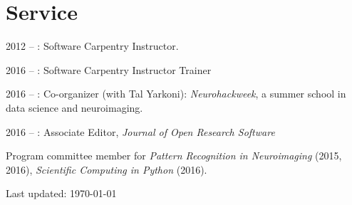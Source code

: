 \documentclass[11pt,fullpage]{article}
\begin{document}
\section*{Service}
2012 -- : Software Carpentry Instructor.

2016 -- : Software Carpentry Instructor Trainer

2016 -- : Co-organizer (with Tal Yarkoni): \emph{Neurohackweek}, a summer school in data science and neuroimaging.

2016 -- : Associate Editor, \emph{Journal of Open Research Software}

Program committee member for \emph{Pattern Recognition in Neuroimaging} (2015, 2016), \emph{Scientific Computing in Python} (2016).

\bigskip
\begin{center}
  \begin{footnotesize}
    Last updated: \today
  \end{footnotesize}
\end{center}

\end{document}
